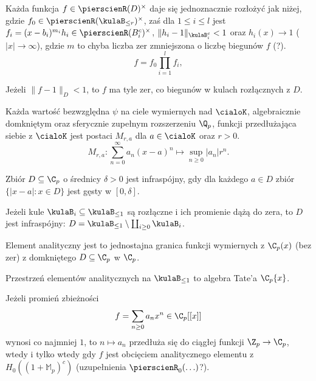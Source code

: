 \begin{fakt}
	Każda funkcja $f \in \pierscienR(D)^\times$ daje się jednoznacznie rozłożyć jak niżej, gdzie $f_0 \in \pierscienR(\kulaB_{\le r})^\times$, zaś dla $1 \le i \le l$ jest $f_i = (x-b_i)^{m_i} h_i \in \pierscienR(B_i^c)^\times$, $\|h_i - 1\|_{\kulaB_i^c} < 1$ oraz $h_i(x) \to 1$ ($|x| \to \infty$), gdzie $m$ to chyba liczba zer zmniejszona o liczbę biegunów $f$ (?).
	\[
		f = f_0 \prod_{i=1}^l f_i,
	\]
\end{fakt}

\begin{fakt}
	Jeżeli $\|f - 1\|_D < 1$, to $f$ ma tyle zer, co biegunów w kulach rozłącznych z $D$.
\end{fakt}

\begin{fakt}
	Każda wartość bezwzględna $\psi$ na ciele wymiernych nad $\cialoK$, algebraicznie domkniętym oraz sferycznie zupełnym rozszerzeniu $\Q_p$, funkcji przedłużająca siebie z $\cialoK$ jest postaci $M_{r,a}$ dla $a \in \cialoK$ oraz $r > 0$.
	\[
		M_{r,a} \colon \sum_{n=0}^\infty a_n (x-a)^n \mapsto \sup_{n \ge 0} |a_n| r^n.
	\]
\end{fakt}

\begin{definicja}
	Zbiór $D \subseteq \C_p$ o średnicy $\delta > 0$ jest infraspójny, gdy dla każdego $a \in D$ zbiór $\{|x-a| : x \in D\}$ jest gęsty w $[0, \delta]$.
\end{definicja}

\begin{fakt}
	Jeżeli kule $\kulaB_i \subseteq \kulaB_{\le 1}$ są rozłączne i ich promienie dążą do zera, to $D$ jest infraspójny: $D = \kulaB_{\le 1} \setminus \coprod_{i \ge 0} \kulaB_i$.
\end{fakt}

\begin{definicja}
	Element analityczny jest to jednostajna granica funkcji wymiernych z $\C_p(x)$ (bez zer) z domkniętego $D \subseteq \C_p$ w $\C_p$.
\end{definicja}

\begin{fakt}
	Przestrzeń elementów analitycznych na $\kulaB_{\le 1}$ to algebra Tate'a $\C_p\{x\}$.
\end{fakt}

\begin{twierdzenie}
	Jeżeli promień zbieżności 
	\[
		f = \sum_{n \ge 0} a_n x^n \in \C_p[[x]]
	\]
	wynosi co najmniej $1$, to $n \mapsto a_n$ przedłuża się do ciągłej funkcji $\Z_p \to \C_p$, wtedy i tylko wtedy gdy $f$ jest obcięciem analitycznego elementu z $H_0((1+ \mathbb M_p)^c)$ (uzupełnienia $\pierscienR_0(\ldots)$?).
\end{twierdzenie}

